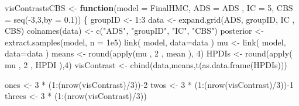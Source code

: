 \documentclass[
  10pt,
  dvipsnames,enabledeprecatedfontcommands]{scrartcl}
\newenvironment{Shaded}{\begin{snugshade}}{\end{snugshade}}
\newcommand{\AttributeTok}[1]{\textcolor[rgb]{0.77,0.63,0.00}{#1}}
\newcommand{\ControlFlowTok}[1]{\textcolor[rgb]{0.13,0.29,0.53}{\textbf{#1}}}
\newcommand{\DecValTok}[1]{\textcolor[rgb]{0.00,0.00,0.81}{#1}}
\newcommand{\FloatTok}[1]{\textcolor[rgb]{0.00,0.00,0.81}{#1}}
\newcommand{\FunctionTok}[1]{\textcolor[rgb]{0.00,0.00,0.00}{#1}}
\newcommand{\NormalTok}[1]{#1}
\newcommand{\OtherTok}[1]{\textcolor[rgb]{0.56,0.35,0.01}{#1}}
\newcommand{\SpecialCharTok}[1]{\textcolor[rgb]{0.00,0.00,0.00}{#1}}
\newcommand{\StringTok}[1]{\textcolor[rgb]{0.31,0.60,0.02}{#1}}
\begin{document}
\begin{Shaded}
\begin{Highlighting}[]
\NormalTok{visContrastsCBS }\OtherTok{\textless{}{-}} \ControlFlowTok{function}\NormalTok{(}\AttributeTok{model =}\NormalTok{ FinalHMC, }\AttributeTok{ADS =}\NormalTok{ ADS , }\AttributeTok{IC =}  \DecValTok{5}\NormalTok{,}
                            \AttributeTok{CBS =} \FunctionTok{seq}\NormalTok{(}\SpecialCharTok{{-}}\DecValTok{3}\NormalTok{,}\DecValTok{3}\NormalTok{,}\AttributeTok{by  =} \FloatTok{0.1}\NormalTok{))}
\NormalTok{  \{}
\NormalTok{  groupID }\OtherTok{\textless{}{-}} \DecValTok{1}\SpecialCharTok{:}\DecValTok{3}
\NormalTok{  data }\OtherTok{\textless{}{-}} \FunctionTok{expand.grid}\NormalTok{(ADS, groupID, IC , CBS)}
  \FunctionTok{colnames}\NormalTok{(data) }\OtherTok{\textless{}{-}} \FunctionTok{c}\NormalTok{(}\StringTok{"ADS"}\NormalTok{, }\StringTok{"groupID"}\NormalTok{, }\StringTok{"IC"}\NormalTok{, }\StringTok{"CBS"}\NormalTok{)}
\NormalTok{  posterior }\OtherTok{\textless{}{-}} \FunctionTok{extract.samples}\NormalTok{(model, }\AttributeTok{n =} \FloatTok{1e5}\NormalTok{)}
  \FunctionTok{link}\NormalTok{( model, }\AttributeTok{data=}\NormalTok{data ) }
\NormalTok{  mu }\OtherTok{\textless{}{-}} \FunctionTok{link}\NormalTok{( model, }\AttributeTok{data=}\NormalTok{data ) }
\NormalTok{  means }\OtherTok{\textless{}{-}}  \FunctionTok{round}\NormalTok{(}\FunctionTok{apply}\NormalTok{(mu , }\DecValTok{2}\NormalTok{ , mean ), }\DecValTok{4}\NormalTok{)}
\NormalTok{  HPDIs }\OtherTok{\textless{}{-}} \FunctionTok{round}\NormalTok{(}\FunctionTok{apply}\NormalTok{( mu , }\DecValTok{2}\NormalTok{ , HPDI ),}\DecValTok{4}\NormalTok{)}
\NormalTok{  visContrast }\OtherTok{\textless{}{-}} \FunctionTok{cbind}\NormalTok{(data,means,}\FunctionTok{t}\NormalTok{(}\FunctionTok{as.data.frame}\NormalTok{(HPDIs)))}
  
\NormalTok{  ones }\OtherTok{\textless{}{-}} \DecValTok{3} \SpecialCharTok{*}\NormalTok{ (}\DecValTok{1}\SpecialCharTok{:}\NormalTok{(}\FunctionTok{nrow}\NormalTok{(visContrast)}\SpecialCharTok{/}\DecValTok{3}\NormalTok{))}\SpecialCharTok{{-}}\DecValTok{2}
\NormalTok{  twos }\OtherTok{\textless{}{-}} \DecValTok{3} \SpecialCharTok{*}\NormalTok{ (}\DecValTok{1}\SpecialCharTok{:}\NormalTok{(}\FunctionTok{nrow}\NormalTok{(visContrast)}\SpecialCharTok{/}\DecValTok{3}\NormalTok{))}\SpecialCharTok{{-}}\DecValTok{1}
\NormalTok{  threes }\OtherTok{\textless{}{-}} \DecValTok{3} \SpecialCharTok{*}\NormalTok{ (}\DecValTok{1}\SpecialCharTok{:}\NormalTok{(}\FunctionTok{nrow}\NormalTok{(visContrast)}\SpecialCharTok{/}\DecValTok{3}\NormalTok{))}
  

\end{Highlighting}
\end{Shaded}
\end{document}
